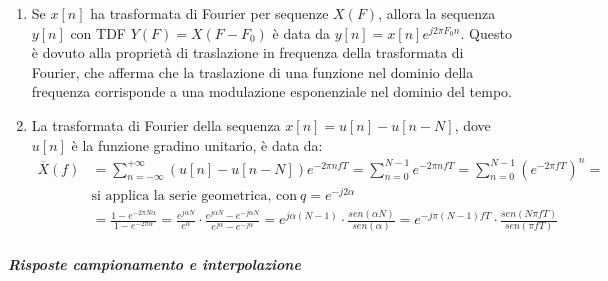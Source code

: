 \documentclass[
]{article}
\begin{document}
\begin{enumerate}
\item
  Se \(x[n]\) ha trasformata di Fourier per sequenze \(X(F)\), allora la
  sequenza \(y[n]\) con TDF \(Y(F)=X(F-F_0)\) è data da
  \(y[n]=x[n]e^{j2\pi F_0n}\). Questo è dovuto alla proprietà di
  traslazione in frequenza della trasformata di Fourier, che afferma che
  la traslazione di una funzione nel dominio della frequenza corrisponde
  a una modulazione esponenziale nel dominio del tempo.
\item
  La trasformata di Fourier della sequenza \(x[n]=u[n]-u[n-N]\), dove
  \(u[n]\) è la funzione gradino unitario, è data da: \begin{align*}
  \displaystyle \overline{X}(f) &= \sum_{n = -\infty}^{+\infty} (u[n]-u[n-N])e^{-2\pi nfT} = \sum_{n = 0}^{N-1}e^{-2\pi nfT} = \sum_{n = 0}^{N-1}(e^{-2\pi fT})^n = \\
  &\text{si applica la serie geometrica, con} \ q = e^{-j2\alpha}& \\
  &= \frac{1-e^{-2\pi N\alpha}}{1-e^{-2\pi \alpha}} = \frac{e^{j \alpha N}}{e^{\alpha}} \cdot \frac{e^{j\alpha N} - e^{-j\alpha N}}{e^{j\alpha } - e^{-j\alpha }} = e^{j \alpha (N-1)} \cdot \frac{sen(\alpha N)}{sen(\alpha)} = e^{-j\pi (N-1)fT} \cdot \frac{sen(N\pi fT)}{sen(\pi fT)}
  \end{align*}
\end{enumerate}

\subparagraph{Risposte campionamento e
interpolazione}\label{risposte-campionamento-e-interpolazione}
\end{document}

